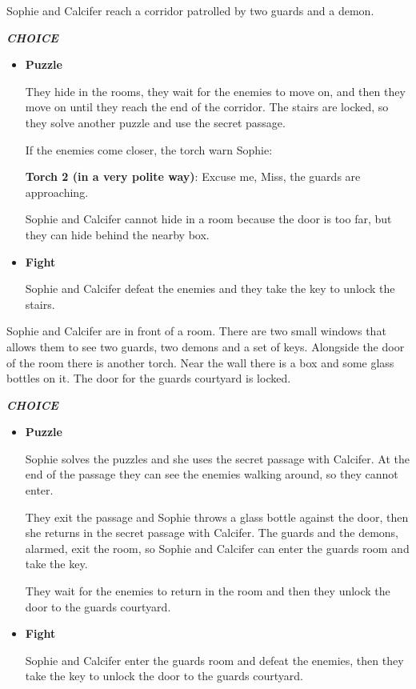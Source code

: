 
Sophie and Calcifer reach a corridor patrolled by two guards and a demon.

\textit{\textbf{CHOICE}}
\begin{itemize}
  \item \textbf{Puzzle}
  
  They hide in the rooms, they wait for the enemies to move on, and then they move on until they reach the end of the corridor. The stairs are locked, so they solve another puzzle and use the secret passage.
  
  If the enemies come closer, the torch warn Sophie:
  
  \textbf{Torch 2 (in a very polite way)}: Excuse me, Miss, the guards are approaching.
  
  Sophie and Calcifer cannot hide in a room because the door is too far, but they can hide behind the nearby box.

  \item \textbf{Fight}
  
  Sophie and Calcifer defeat the enemies and they take the key to unlock the stairs.
\end{itemize}


Sophie and Calcifer are in front of a room. There are two small windows that allows them to see two guards, two demons and a set of keys. Alongside the door of the room there is another torch. Near the wall there is a box and some glass bottles on it. The door for the guards courtyard is locked.

\textit{\textbf{CHOICE}}
\begin{itemize}
  \item \textbf{Puzzle}
  
  Sophie solves the puzzles and she uses the secret passage with Calcifer. At the end of the passage they can see the enemies walking around, so they cannot enter.
  
  They exit the passage and Sophie throws a glass bottle against the door, then she returns in the secret passage with Calcifer. The guards and the demons, alarmed, exit the room, so Sophie and Calcifer can enter the guards room and take the key.
  
  They wait for the enemies to return in the room and then they unlock the door to the guards courtyard.

  \item \textbf{Fight}
  
  Sophie and Calcifer enter the guards room and defeat the enemies, then they take the key to unlock the door to the guards courtyard.
\end{itemize}

